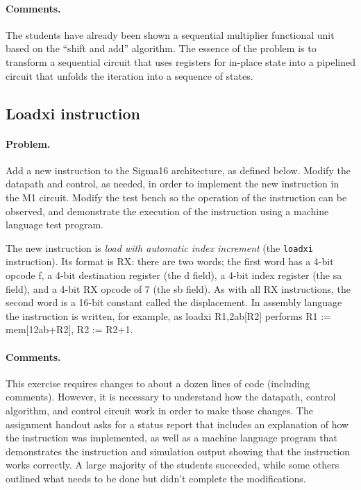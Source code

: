 \documentclass[submission,copyright,creativecommons]{eptcs}
\begin{document}
\paragraph{Comments.}
The students have already been shown a sequential multiplier
functional unit based on the ``shift and add'' algorithm.  The
essence of the problem is to transform a sequential circuit that
uses registers for in-place state into a pipelined circuit that
unfolds the iteration into a sequence of states.

\subsection{Loadxi instruction}

\paragraph{Problem.} Add a new instruction to the Sigma16
architecture, as defined below.  Modify the datapath and control,
as needed, in order to implement the new instruction in the M1
circuit.  Modify the test bench so the operation of the instruction
can be observed, and demonstrate the execution of the instruction
using a machine language test program.

The new instruction is \emph{load with automatic index increment}
(the \texttt{loadxi} instruction). Its format is RX: there are two
words; the first word has a 4-bit opcode f, a 4-bit destination
register (the d field), a 4-bit index register (the sa field), and
a 4-bit RX opcode of 7 (the sb field).  As with all RX
instructions, the second word is a 16-bit constant called the
displacement. In assembly language the instruction is written, for
example, as loadxi R1,\12ab[R2] performs R1 := mem[12ab+R2], R2 := R2+1.

\paragraph{Comments.}  This exercise requires changes to about a
dozen lines of code (including comments).  However, it is necessary
to understand how the datapath, control algorithm, and control
circuit work in order to make those changes.  The assignment
handout asks for a status report that includes an explanation of
how the instruction was implemented, as well as a machine language
program that demonstrates the instruction and simulation output
showing that the instruction works correctly.  A large majority of
the students succeeded, while some others outlined what needs to be
done but didn't complete the modifications.
\end{document}
